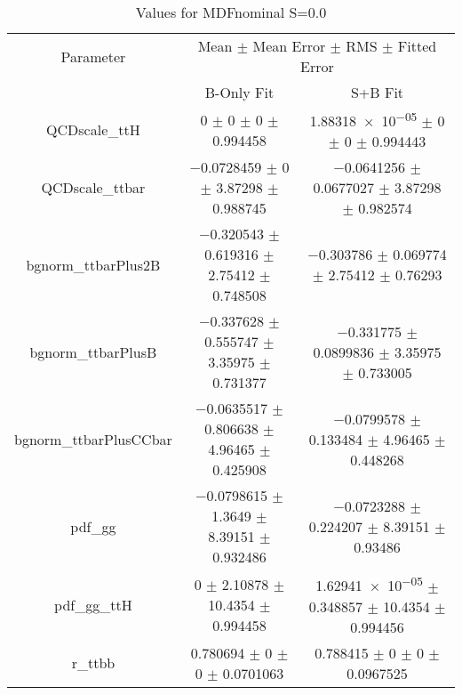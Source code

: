 \begin{table}
\centering
\caption{Values for MDFnominal S=0.0}
\begin{tabular}{ccc}
\toprule
Parameter & \multicolumn{2}{c}{Mean $\pm$ Mean Error $\pm$ RMS $\pm$ Fitted Error}\\
 & B-Only Fit & S+B Fit\\
\midrule
QCDscale\_ttH & \num{0} $\pm$ \num{0} $\pm$ \num{0} $\pm$ \num{0.994458} & \num{1.88318e-05} $\pm$ \num{0} $\pm$ \num{0} $\pm$ \num{0.994443}\\
QCDscale\_ttbar & \num{-0.0728459} $\pm$ \num{0} $\pm$ \num{3.87298} $\pm$ \num{0.988745} & \num{-0.0641256} $\pm$ \num{0.0677027} $\pm$ \num{3.87298} $\pm$ \num{0.982574}\\
bgnorm\_ttbarPlus2B & \num{-0.320543} $\pm$ \num{0.619316} $\pm$ \num{2.75412} $\pm$ \num{0.748508} & \num{-0.303786} $\pm$ \num{0.069774} $\pm$ \num{2.75412} $\pm$ \num{0.76293}\\
bgnorm\_ttbarPlusB & \num{-0.337628} $\pm$ \num{0.555747} $\pm$ \num{3.35975} $\pm$ \num{0.731377} & \num{-0.331775} $\pm$ \num{0.0899836} $\pm$ \num{3.35975} $\pm$ \num{0.733005}\\
bgnorm\_ttbarPlusCCbar & \num{-0.0635517} $\pm$ \num{0.806638} $\pm$ \num{4.96465} $\pm$ \num{0.425908} & \num{-0.0799578} $\pm$ \num{0.133484} $\pm$ \num{4.96465} $\pm$ \num{0.448268}\\
pdf\_gg & \num{-0.0798615} $\pm$ \num{1.3649} $\pm$ \num{8.39151} $\pm$ \num{0.932486} & \num{-0.0723288} $\pm$ \num{0.224207} $\pm$ \num{8.39151} $\pm$ \num{0.93486}\\
pdf\_gg\_ttH & \num{0} $\pm$ \num{2.10878} $\pm$ \num{10.4354} $\pm$ \num{0.994458} & \num{1.62941e-05} $\pm$ \num{0.348857} $\pm$ \num{10.4354} $\pm$ \num{0.994456}\\
r\_ttbb & \num{0.780694} $\pm$ \num{0} $\pm$ \num{0} $\pm$ \num{0.0701063} & \num{0.788415} $\pm$ \num{0} $\pm$ \num{0} $\pm$ \num{0.0967525}\\
\bottomrule
\end{tabular}
\end{table}